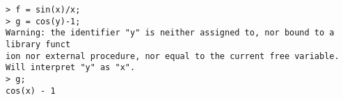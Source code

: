 \begin{center}\begin{minipage}{15cm}\begin{Verbatim}[frame=single]
> f = sin(x)/x;
> g = cos(y)-1;
Warning: the identifier "y" is neither assigned to, nor bound to a library funct
ion nor external procedure, nor equal to the current free variable.
Will interpret "y" as "x".
> g;
cos(x) - 1
\end{Verbatim}
\end{minipage}\end{center}
